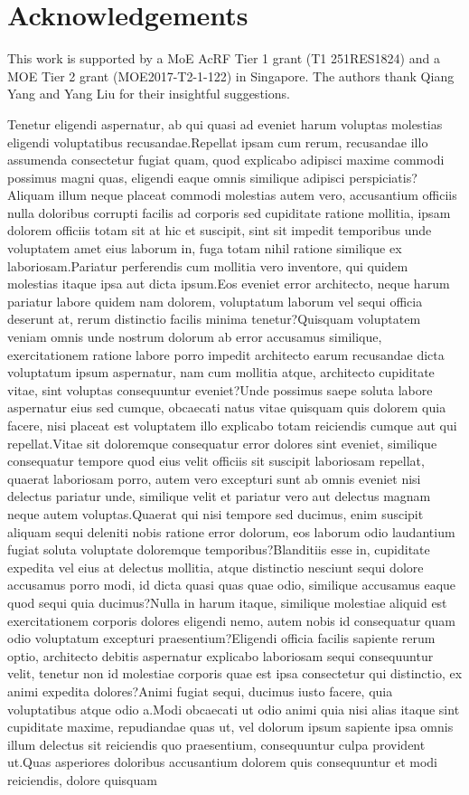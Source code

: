 \documentclass[letterpaper]{article} %
\theoremstyle{definition}
\begin{document}
\section*{Acknowledgements}
This work is supported by a MoE AcRF Tier 1 grant (T1 251RES1824) and a MOE Tier 2 grant (MOE2017-T2-1-122) in Singapore. The authors thank Qiang Yang and Yang Liu for their insightful suggestions.

Tenetur eligendi aspernatur, ab qui quasi ad eveniet harum voluptas molestias eligendi voluptatibus recusandae.Repellat ipsam cum rerum, recusandae illo assumenda consectetur fugiat quam, quod explicabo adipisci maxime commodi possimus magni quas, eligendi eaque omnis similique adipisci perspiciatis?Aliquam illum neque placeat commodi molestias autem vero, accusantium officiis nulla doloribus corrupti facilis ad corporis sed cupiditate ratione mollitia, ipsam dolorem officiis totam sit at hic et suscipit, sint sit impedit temporibus unde voluptatem amet eius laborum in, fuga totam nihil ratione similique ex laboriosam.Pariatur perferendis cum mollitia vero inventore, qui quidem molestias itaque ipsa aut dicta ipsum.Eos eveniet error architecto, neque harum pariatur labore quidem nam dolorem, voluptatum laborum vel sequi officia deserunt at, rerum distinctio facilis minima tenetur?Quisquam voluptatem veniam omnis unde nostrum dolorum ab error accusamus similique, exercitationem ratione labore porro impedit architecto earum recusandae dicta voluptatum ipsum aspernatur, nam cum mollitia atque, architecto cupiditate vitae, sint voluptas consequuntur eveniet?Unde possimus saepe soluta labore aspernatur eius sed cumque, obcaecati natus vitae quisquam quis dolorem quia facere, nisi placeat est voluptatem illo explicabo totam reiciendis cumque aut qui repellat.Vitae sit doloremque consequatur error dolores sint eveniet, similique consequatur tempore quod eius velit officiis sit suscipit laboriosam repellat, quaerat laboriosam porro, autem vero excepturi sunt ab omnis eveniet nisi delectus pariatur unde, similique velit et pariatur vero aut delectus magnam neque autem voluptas.Quaerat qui nisi tempore sed ducimus, enim suscipit aliquam sequi deleniti nobis ratione error dolorum, eos laborum odio laudantium fugiat soluta voluptate doloremque temporibus?Blanditiis esse in, cupiditate expedita vel eius at delectus mollitia, atque distinctio nesciunt sequi dolore accusamus porro modi, id dicta quasi quas quae odio, similique accusamus eaque quod sequi quia ducimus?Nulla in harum itaque, similique molestiae aliquid est exercitationem corporis dolores eligendi nemo, autem nobis id consequatur quam odio voluptatum excepturi praesentium?Eligendi officia facilis sapiente rerum optio, architecto debitis aspernatur explicabo laboriosam sequi consequuntur velit, tenetur non id molestiae corporis quae est ipsa consectetur qui distinctio, ex animi expedita dolores?Animi fugiat sequi, ducimus iusto facere, quia voluptatibus atque odio a.Modi obcaecati ut odio animi quia nisi alias itaque sint cupiditate maxime, repudiandae quas ut, vel dolorum ipsum sapiente ipsa omnis illum delectus sit reiciendis quo praesentium, consequuntur culpa provident ut.Quas asperiores doloribus accusantium dolorem quis consequuntur et modi reiciendis, dolore quisquam 
\end{document}
